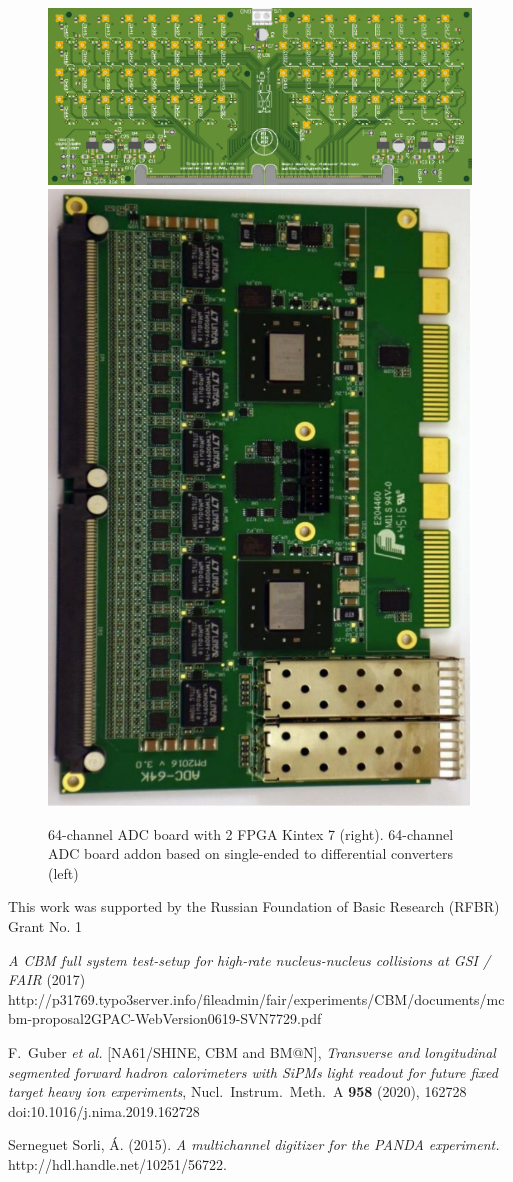 \documentclass[a4paper,11pt]{article}
\begin{document}
\begin{figure}[htbp]
\centering %
\includegraphics[width=.5\textwidth]{ADC_addon.png}
\qquad
\includegraphics[width=.2\textwidth]{ADC_board.png}

\caption{\label{fig:3} 64-channel ADC board with 2 FPGA Kintex 7 (right). 64-channel ADC board addon  based on single-ended to differential converters (left) }
\end{figure}


\acknowledgments
This work was supported by the Russian Foundation of Basic Research (RFBR) Grant No. 1



\begin{thebibliography}{99}


\emph{A CBM full system test-setup for high-rate nucleus-nucleus collisions at GSI / FAIR} (2017) http://p31769.typo3server.info/fileadmin/fair/experiments/CBM/documents/mcbm-proposal2GPAC-WebVersion0619-SVN7729.pdf


F.~Guber \textit{et al.} [NA61/SHINE, CBM and BM@N],
\emph{Transverse and longitudinal segmented forward hadron calorimeters with SiPMs light readout for future fixed target heavy ion experiments},
Nucl.\ Instrum.\ Meth.\ A \textbf{958} (2020), 162728
doi:10.1016/j.nima.2019.162728


Serneguet Sorli, Á. (2015). \emph{A multichannel digitizer for the PANDA experiment.} http://hdl.handle.net/10251/56722.



\end{thebibliography}
\end{document}
